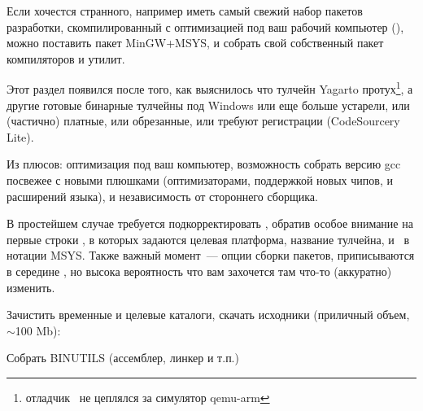 

Если хочестся странного, например иметь самый свежий набор пакетов разработки,
скомпилированный с оптимизацией под ваш рабочий компьютер (),
можно поставить пакет MinGW+MSYS, и собрать свой собственный пакет компиляторов
и утилит.

\bigskip
Этот раздел появился после того, как выяснилось что тулчейн Yagarto
протух\footnote{отладчик \gdb\ не цеплялся за симулятор qemu-arm}, а другие
готовые бинарные тулчейны под Windows или еще больше устарели, или (частично) 
платные, или обрезанные, или требуют регистрации (CodeSourcery Lite).

\bigskip
{}

Из плюсов: оптимизация под ваш компьютер, возможность собрать версию gcc
посвежее с новыми плюшками (оптимизаторами, поддержкой новых чипов, и расширений
языка), и независимость от стороннего сборщика.
\bigskip

В простейшем случае требуется подкорректировать ,
обратив особое внимание на первые строки \makefile, в которых задаются целевая
платформа, название тулчейна, и \ в нотации
MSYS. Также важный момент\ --- опции сборки пакетов, приписываются в середине
\makefile, но высока вероятность что вам захочется там что-то (аккуратно)
изменить.

\bigskip

\bigskip
{}

\bigskip
{}
\bigskip


Зачистить временные и целевые каталоги, скачать исходники (приличный объем,
$\sim$100 Mb):


Собрать BINUTILS (ассемблер, линкер и т.п.)


